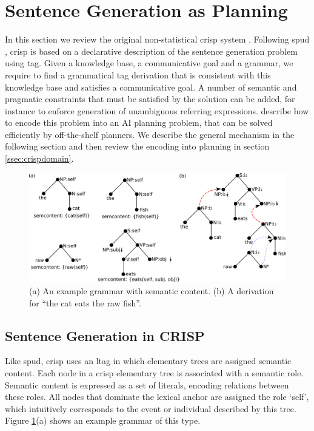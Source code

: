 \section{Sentence Generation as Planning}
\label{sec:crisp}
In this section we review the original non-statistical {\sc crisp} system \cite{kollerstone2007}. 
Following {\sc spud} \cite{stonedoran1997}, {\sc crisp} is based on a declarative description of the sentence generation problem using {\sc tag}. Given a knowledge base, a communicative goal and a grammar, we require to find a grammatical {\sc tag} derivation that is consistent with this knowledge base and satisfies a communicative goal. A number of semantic and pragmatic constraints that must be satisfied by the solution can be added, for instance to enforce generation of unambiguous referring expressions.  describe how to encode this problem into an AI planning problem, that can be solved efficiently by off-the-shelf planners. We describe the general mechanism in the following section and then review the encoding into planning in section \ref{ssec:crispdomain}. 
\begin{figure}[th]
\begin{center}
\includegraphics[width=.8\textwidth]{figures/grammar.pdf}
\caption{\label{fig:grammar}(a) An example grammar with semantic content. (b) A derivation for ``the cat eats the raw fish''. }
\end{center}
\end{figure}

\subsection{Sentence Generation in CRISP}
Like {\sc spud}, {\sc crisp} uses an {\sc ltag} in which elementary trees are assigned semantic content. Each node in a {\sc crisp} elementary tree is associated with a semantic role. Semantic content is expressed as a set of literals, encoding relations between these roles. All nodes that dominate the lexical anchor are assigned the role `self', which intuitively corresponds to the event or individual described by this tree. Figure \ref{fig:grammar}(a) shows an example grammar of this type. 

